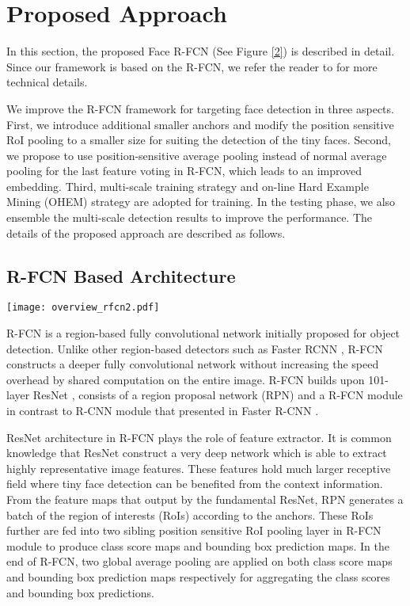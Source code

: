 \documentclass{article} \usepackage{nips13submit_e,times}
\begin{document}
\section{Proposed Approach}


In this section, the proposed Face R-FCN (See Figure \ref{2}) is described in detail. Since our framework is based on the R-FCN, we refer the reader to \cite{RFCN} for more technical details.

We improve the R-FCN framework for targeting face detection in three aspects.
First, we introduce additional smaller anchors and modify the position sensitive RoI pooling to a smaller size for suiting the detection of the tiny faces. 
Second, we propose to use position-sensitive average pooling instead of normal average pooling for the last feature voting in R-FCN, which leads to an improved embedding. 
Third, multi-scale training strategy and on-line Hard Example Mining (OHEM) strategy \cite{OHEM} are adopted for training. In the testing phase, we also ensemble the multi-scale detection results to improve the performance. 
The details of the proposed approach are described as follows.


\subsection{R-FCN Based Architecture}

\begin{figure*}
  \centering
\texttt{[image: overview\_rfcn2.pdf]}
  \caption{An overview of our R-FCN based framework. Note that position-sensitive average pooling is used to replace global average pooling for the final feature voting.
    }\label{2}
\end{figure*}


R-FCN \cite{RFCN} is a region-based fully convolutional network initially proposed for object detection. Unlike other region-based detectors such as Faster RCNN \cite{FastRCNN}, R-FCN constructs a deeper fully convolutional network without increasing the speed overhead by shared computation on the entire image. R-FCN builds upon 101-layer ResNet \cite{ResNet101}, consists of a region proposal network (RPN) and a R-FCN module in contrast to R-CNN module that presented in Faster R-CNN \cite{FastRCNN}. 

ResNet architecture in R-FCN plays the role of feature extractor. It is common knowledge that ResNet construct a very deep network which is able to extract highly representative image features. These features hold much larger receptive field where tiny face detection can be benefited from the context information. From the feature maps that output by the fundamental ResNet, RPN generates a batch of the region of interests (RoIs) according to the anchors. These RoIs further are fed into two sibling position sensitive RoI pooling layer in R-FCN module to produce class score maps and bounding box prediction maps. In the end of R-FCN, two global average pooling are applied on both class score maps and bounding box prediction maps respectively for aggregating the class scores and bounding box predictions. 
\end{document}
